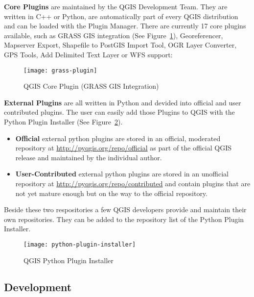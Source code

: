 \textbf{Core Plugins} are maintained by the QGIS Development Team. They are
written in C++ or Python, are automatically part of every QGIS distribution
and can be loaded with the Plugin Manager. There are currently 17 core
plugins available, such as GRASS GIS integration (See
Figure~\ref{fig:grass-plugin}), Georeferencer, Mapserver Export, Shapefile to
PostGIS Import Tool, OGR Layer Converter, GPS Tools, Add Delimited Text Layer
or WFS support:  

\begin{figure}[h]
   \begin{center}
   \caption{QGIS Core Plugin (GRASS GIS Integration)}
    \label{fig:grass-plugin}\smallskip
   \texttt{[image: grass-plugin]}
\end{center}
\end{figure}

\textbf{External Plugins} are all written in Python and devided into official
and user contributed plugins. The user can easily add those Plugins to QGIS
with the Python Plugin Installer (See Figure~\ref{fig:python-plugin}).

\begin{itemize}
\item \textbf{Official} external python plugins are stored in an official,
moderated repository at \url{http://pyqgis.org/repo/official} as part of the
official QGIS release and maintained by the individual author.
\item \textbf{User-Contributed} external python plugins are stored in an
unofficial repository at \url{http://pyqgis.org/repo/contributed} and contain
plugins that are not yet mature enough but on the way to the official
repository.
\end{itemize}

Beside these two respositories a few QGIS developers provide and maintain
their own repositories. They can be added to the repository list of the
Python Plugin Installer.  

\begin{figure}[h]
   \begin{center}
   \caption{QGIS Python Plugin Installer}\label{fig:python-plugin}\smallskip
   \texttt{[image: python-plugin-installer]}
\end{center}
\end{figure}

\subsection{Development}

